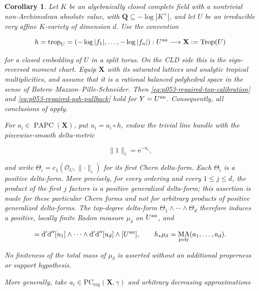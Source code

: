 \documentclass[11pt,a4paper]{article}
\newtheorem{corollary}[corollary]{Corollary}
\theoremstyle{definition}
\theoremstyle{remark}
\newcommand{\rd}{\mathrm d}
\newcommand{\dprime}{\rd'}
\newcommand{\ddprime}{\rd''}
\newcommand{\dprimeddprime}{\dprime\ddprime}
\DeclareMathOperator{\MA}{MA}
\begin{document}
\begin{corollary}\label{cor:p053-algebraic-chart-repaired-candidate}
Let \(K\) be an algebraically closed complete field with a nontrivial
non-Archimedean absolute value, with
\(\mathbf Q\subseteq-\log|K^\times|\), and let \(U\) be an irreducible very affine
\(K\)-variety of dimension \(d\).  Use the convention

\[
 h=\operatorname{trop}_U=(-\log|f_1|,\ldots,-\log|f_n|):
 U^{\mathrm{an}}\longrightarrow\mathbf X:=\operatorname{Trop}(U)
\]

for a closed embedding of \(U\) in a split torus.  On the CLD side this is
the sign-reversed moment chart.  Equip \(\mathbf X\) with its saturated
lattices and analytic tropical multiplicities, and assume that it is a
rational balanced polyhedral space in the sense of
Botero--Mazzon--Pille-Schneider.  Then
\eqref{eq:p053-repaired-top-calibration} and
\eqref{eq:p053-repaired-psh-pullback} hold for \(Y=U^{\mathrm{an}}\).  Consequently,
all conclusions of
 apply.

For \(a_i\in\operatorname{PAPC}(\mathbf X)\), put \(u_i=a_i\circ h\),
endow the trivial line bundle with the piecewise-smooth delta-metric

\[
 \lVert1\rVert_i=\mathrm e^{-u_i},
\]

and write \(\Theta_i=c_1(\mathcal O_U,\lVert\cdot\rVert_i)\) for its first
Chern delta-form.  Each \(\Theta_i\) is a positive delta-form.  More
precisely, for every ordering and every \(1\leq j\leq d\), the product of
the first \(j\) factors is a positive generalized delta-form; this assertion
is made for these particular Chern forms and not for arbitrary products of
positive generalized delta-forms.  The top-degree delta-form
\(\Theta_1\wedge\cdots\wedge\Theta_d\) therefore induces a positive,
locally finite Radon measure \(\mu_\delta\) on \(U^{\mathrm{an}}\), and

\begin{equation}
 [\mu_\delta]
 =\dprimeddprime[u_1]\wedge\cdots\wedge
   \dprimeddprime[u_d]\wedge[U^{\an}],
 \qquad
 h_*\mu_\delta=\MA_{\mathrm{poly}}(a_1,\ldots,a_d).
 \label{eq:p054-repaired-delta-comparison}
\end{equation}

No finiteness of the total mass of \(\mu_\delta\) is asserted without an
additional properness or support hypothesis.

More generally, take
\(a_i\in\mathrm{PC}_{\mathrm{reg}}(\mathbf X,\gamma)\) and arbitrary
decreasing approximations


\end{corollary}
\end{document}
